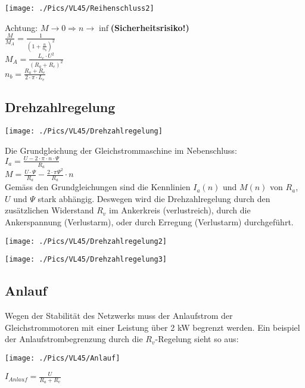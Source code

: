 \begin{minipage}{0.3 \linewidth}
\texttt{[image: ./Pics/VL45/Reihenschluss2]}
\end{minipage}
\begin{minipage}{0.7 \linewidth}
\large{Achtung:} $M \rightarrow 0 \Rightarrow n \rightarrow \inf $\textbf{(Sicherheitsrisiko!)} \\

$\frac{M}{M_A} = \frac{1}{(1 + \frac{n}{n_b})^2} $  \\

$M_A = \frac{L_e \cdot U^2}{(R_a + R_e)^2} $ \\

$n_b = \frac{R_a + R_e}{2 \cdot \pi \cdot L_e}$
\end{minipage}

\subsection{Drehzahlregelung}
\begin{minipage}{0.3 \linewidth}
\texttt{[image: ./Pics/VL45/Drehzahlregelung]}
\end{minipage}
\begin{minipage}{0.7 \linewidth}
Die Grundgleichung der Gleichstrommaschine im Nebenschluss: \\

$I_a = \frac{U- 2\cdot\pi \cdot n \cdot \Psi}{R_a}$\\

$M = \frac{U \cdot \Psi}{R_a}- \frac{2\cdot\pi\Psi^2}{R_a}\cdot n$\\

Gemäss den Grundgleichungen sind die Kennlinien $I_a(n)$ und $M(n)$ von $R_a$, $U$ und $\Psi$ stark abhängig. Deswegen wird die Drehzahlregelung durch den zusätzlichen Widerstand $R_v$ im Ankerkreis (verlustreich), durch die Ankerspannung (Verlustarm), oder durch Erregung (Verlustarm) durchgeführt.
\end{minipage}

\begin{minipage}{0.3 \linewidth}
\texttt{[image: ./Pics/VL45/Drehzahlregelung2]}
\end{minipage}
\begin{minipage}{0.3 \linewidth}
\texttt{[image: ./Pics/VL45/Drehzahlregelung3]}
\end{minipage}

\subsection{Anlauf}
Wegen der Stabilität des Netzwerks muss der Anlaufstrom der Gleichstrommotoren mit einer Leistung über 2 kW begrenzt werden. Ein beispiel der Anlaufstrombegrenzung durch die $R_v$-Regelung sieht so aus: \\
\begin{minipage}{0.75 \linewidth}
\texttt{[image: ./Pics/VL45/Anlauf]}
\end{minipage}
\begin{minipage}{0.25 \linewidth}
$I_{Anlauf} = \frac{U}{R_a + R_v}$
\end{minipage}

